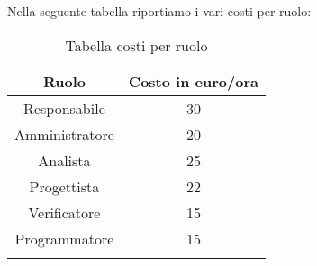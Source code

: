 Nella seguente tabella riportiamo i vari costi per ruolo:
\begin{center}
\begin{longtable}{|c|c|}
\toprule
\textbf{Ruolo} & \textbf{Costo in euro/ora}\\
\midrule
Responsabile & 30\\
Amministratore & 20\\
Analista & 25\\
Progettista & 22\\
Verificatore & 15\\
Programmatore & 15\\
\bottomrule
\caption{Tabella costi per ruolo}
\label{tab:costiruolo}
\end{longtable}
\end{center}



